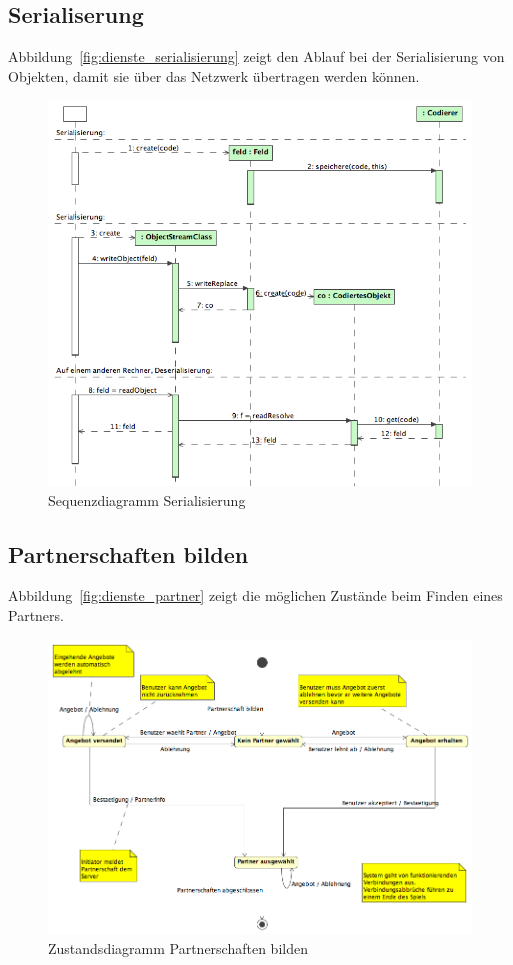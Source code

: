 \documentclass[12pt,halfparskip]{scrartcl}
\begin{document}
\subsection{Serialiserung} %
\label{sub:serialiserung}
Abbildung~\vref{fig:dienste_serialisierung} zeigt den Ablauf bei der Serialisierung von Objekten, damit sie über das Netzwerk übertragen werden können.
\begin{figure}[h]
	\centering
	\includegraphics[width=\textwidth]{dienste_serialisierung}
	\caption{Sequenzdiagramm Serialisierung}
	\label{fig:dienste_serialisierung}
\end{figure}

\clearpage
\subsection{Partnerschaften bilden} %
\label{sub:partnerschaften_bilden}
Abbildung~\vref{fig:dienste_partner} zeigt die möglichen Zustände beim Finden eines Partners.
\begin{figure}[h]
	\centering
	\includegraphics[width=\textwidth]{dienste_partner}
	\caption{Zustandsdiagramm Partnerschaften bilden}
	\label{fig:dienste_partner}
\end{figure}
\end{document}
